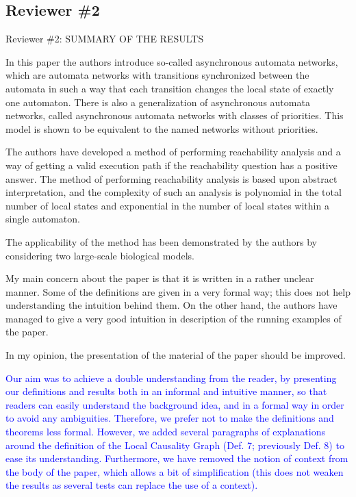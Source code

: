 \documentclass[11pt]{article}
\newcommand{\ilanswer}[1]{\textcolor{blue}{#1}}
\newcommand{\answer}[1]{\ilanswer{#1}\vspace*{1em}}
\begin{document}



\subsection*{Reviewer \#2}

Reviewer \#2: SUMMARY OF THE RESULTS

In this paper the authors introduce so-called asynchronous automata networks, which are automata networks with transitions synchronized between the automata in such a way that each transition changes the local state of exactly one automaton. There is also a generalization of asynchronous automata networks, called asynchronous automata networks with classes of priorities. This model is shown to be equivalent to the named networks without priorities.

The authors have developed a method of performing reachability analysis and a way of getting a valid execution path if the reachability question has a positive answer. The method of performing reachability analysis is based upon abstract interpretation, and the complexity of such an analysis is polynomial in the total number of local states and exponential in the number of local states within a single automaton.

The applicability of the method has been demonstrated by the authors by considering two large-scale biological models.

My main concern about the paper is that it is written in a rather unclear manner. Some of the definitions are given in a very formal way; this does not help understanding the intuition behind them. On the other hand, the authors have managed to give a very good intuition in description of the running examples of the paper.

In my opinion, the presentation of the material of the paper should be improved.

\answer{Our aim was to achieve a double understanding from the reader,
by presenting our definitions and results both in an informal and intuitive manner,
so that readers can easily understand the background idea,
and in a formal way in order to avoid any ambiguities.
Therefore, we prefer not to make the definitions and theorems less formal.
However, we added several paragraphs of explanations around the definition of the Local Causality Graph (Def. 7; previously Def. 8) to ease its understanding.
Furthermore, we have removed the notion of context from the body of the paper,
which allows a bit of simplification
(this does not weaken the results as several tests can replace the use of a context).
}
\end{document}
